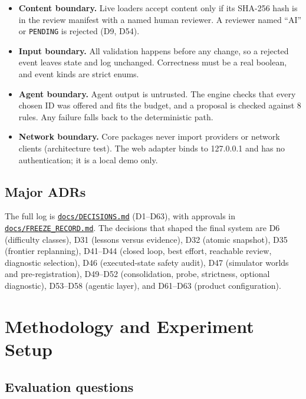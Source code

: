 \documentclass[11pt,a4paper]{article}
\newcommand{\finaltag}{cs5903-final-2026}
\newcommand{\repobase}{https://github.com/vhemanth06/AdaptEngine}
\newcommand{\repo}[1]{\href{\repobase/blob/\finaltag/#1}{\nolinkurl{#1}}}
\begin{document}
\begin{itemize}
\item \textbf{Content boundary.} Live loaders accept content only if its SHA-256 hash is in the review manifest with a named human reviewer. A reviewer named ``AI'' or \texttt{PENDING} is rejected (D9, D54).
\item \textbf{Input boundary.} All validation happens before any change, so a rejected event leaves state and log unchanged. Correctness must be a real boolean, and event kinds are strict enums.
\item \textbf{Agent boundary.} Agent output is untrusted. The engine checks that every chosen ID was offered and fits the budget, and a proposal is checked against 8 rules. Any failure falls back to the deterministic path.
\item \textbf{Network boundary.} Core packages never import providers or network clients (architecture test). The web adapter binds to 127.0.0.1 and has no authentication; it is a local demo only.
\end{itemize}

\subsection{Major ADRs}

The full log is \repo{docs/DECISIONS.md} (D1--D63), with approvals in \repo{docs/FREEZE_RECORD.md}. The decisions that shaped the final system are D6 (difficulty classes), D31 (lessons versus evidence), D32 (atomic snapshot), D35 (frontier replanning), D41--D44 (closed loop, best effort, reachable review, diagnostic selection), D46 (executed-state safety audit), D47 (simulator worlds and pre-registration), D49--D52 (consolidation, probe, strictness, optional diagnostic), D53--D58 (agentic layer), and D61--D63 (product configuration).

\section{Methodology and Experiment Setup}

\subsection{Evaluation questions}
\end{document}
